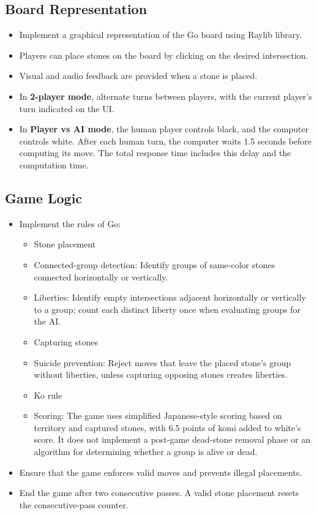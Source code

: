 \subsection{Board Representation}

\begin{itemize} 
    \item Implement a graphical representation of the Go board using Raylib library.
    \item Players can place stones on the board by clicking on the desired intersection.
    \item Visual and audio feedback are provided when a stone is placed.
    \item In \textbf{2-player mode}, alternate turns between players, with the current player's turn indicated on the UI.
    \item In \textbf{Player vs AI mode}, the human player controls black, and the computer controls white. After each human turn, the computer waits 1.5 seconds before computing
    its move. The total response time includes this delay and the computation time.
\end{itemize}

\subsection{Game Logic}

\begin{itemize}
    \item Implement the rules of Go:
    \begin{itemize}
        \item Stone placement
        \item Connected-group detection: Identify groups of same-color stones connected horizontally or vertically.
        \item Liberties: Identify empty intersections adjacent horizontally or vertically to a group; count each distinct liberty once when evaluating groups for the AI.
        \item Capturing stones
        \item Suicide prevention: Reject moves that leave the placed stone's group without liberties, unless capturing opposing stones creates liberties.
        \item Ko rule
        \item Scoring: The game uses simplified Japanese-style scoring based
        on territory and captured stones, with 6.5 points of komi added to white's score.
        It does not implement a post-game dead-stone removal phase or an
        algorithm for determining whether a group is alive or dead. 
    \end{itemize}
    \item Ensure that the game enforces valid moves and prevents illegal placements.
    \item End the game after two consecutive passes. A valid stone placement resets the consecutive-pass counter.
\end{itemize}


